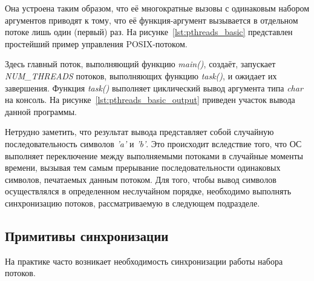 Она устроена таким образом, что её многократные вызовы с одинаковым набором аргументов
приводят к тому, что её функция-аргумент вызывается в отдельном потоке лишь один (первый) раз.
На рисунке~\ref{lst:pthreads_basic} представлен простейший пример управления POSIX-потоком.


Здесь главный поток, выполняющий функцию \textit{main()},
создаёт, запускает \textit{NUM\_THREADS} потоков, выполняющих функцию \textit{task()},
и ожидает их завершения. Функция \textit{task()} выполняет циклический вывод
аргумента типа \textit{char} на консоль. На рисунке~\ref{lst:pthreads_basic_output}
приведен участок вывода данной программы.


Нетрудно заметить, что результат вывода представляет собой случайную
последовательность символов \textit{'a'} и \textit{'b'}.
Это происходит вследствие того, что ОС выполняет переключение между
выполняемыми потоками в случайные моменты времени, вызывая тем самым прерывание
последовательности одинаковых символов, печатаемых данным потоком.
Для того, чтобы вывод символов осуществлялся в определенном неслучайном порядке,
необходимо выполнять синхронизацию потоков, рассматриваемую в следующем подразделе.

\subsection{Примитивы синхронизации}

На практике часто возникает необходимость синхронизации работы набора потоков.




